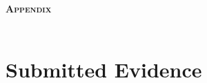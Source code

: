 \documentclass[12pt,\documentclassflag]{article}
\begin{document}
\newpage 

\begin{centering}
  \bf\scshape Appendix \\~\\
  \rm 
\end{centering}

\tableofcontents


\section{Submitted Evidence}%


% 




\newpage\empty%
\end{document}

